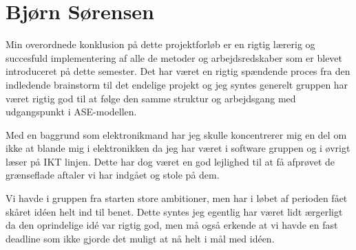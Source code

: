 \section{Bjørn Sørensen}
Min overordnede konklusion på dette projektforløb er en rigtig lærerig og succesfuld implementering af alle de metoder og arbejdsredskaber som er blevet introduceret på dette semester. Det har været en rigtig spændende proces fra den indledende brainstorm til det endelige projekt og jeg syntes generelt gruppen har været rigtig god til at følge den samme struktur og arbejdsgang med udgangspunkt i ASE-modellen.

Med en baggrund som elektronikmand har jeg skulle koncentrerer mig en del om ikke at blande mig i elektronikken da jeg har været i software gruppen og i øvrigt læser på IKT linjen. Dette har dog været en god lejlighed til at få afprøvet de grænseflade aftaler vi har indgået og stole på dem.

Vi havde i gruppen fra starten store ambitioner, men har i løbet af perioden fået skåret idéen helt ind til benet. Dette syntes jeg egentlig har været lidt ærgerligt da den oprindelige idé var rigtig god, men må også erkende at vi havde en fast deadline som ikke gjorde det muligt at nå helt i mål med idéen.